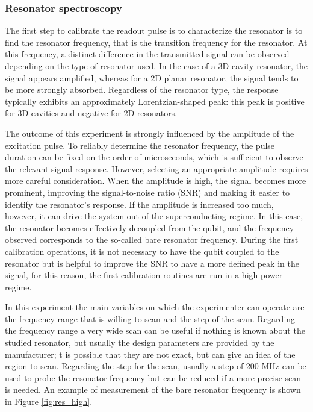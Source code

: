 \subsubsection{Resonator spectroscopy}
The first step to calibrate the readout pulse is to characterize the resonator is to find the resonator frequency, that is the transition frequency for the resonator. 
At this frequency, a distinct difference in the transmitted signal can be observed depending on the type of resonator used. 
In the case of a 3D cavity resonator, the signal appears amplified, whereas for a 2D planar resonator, the signal tends to be more strongly absorbed. 
Regardless of the resonator type, the response typically exhibits an approximately Lorentzian-shaped peak: this peak is positive for 3D cavities and negative for 2D resonators.

The outcome of this experiment is strongly influenced by the amplitude of the excitation pulse. 
To reliably determine the resonator frequency, the pulse duration can be fixed on the order of microseconds, which is sufficient to observe the relevant signal response.
However, selecting an appropriate amplitude requires more careful consideration. When the amplitude is high, the signal becomes more prominent, improving the signal-to-noise ratio (SNR) and making it easier to identify the resonator's response.
If the amplitude is increased too much, however, it can drive the system out of the superconducting regime.  
In this case, the resonator becomes effectively decoupled from the qubit, and the frequency observed corresponds to the so-called bare resonator frequency.
During the first calibration operations, it is not necessary to have the qubit coupled to the resonator but is helpful to improve the SNR to have a more defined peak in the signal, for this reason, the first calibration routines are run in a high-power regime.

In this experiment the main variables on which the experimenter can operate are the frequency range that is willing to scan and the step of the scan. 
Regarding the frequency range a very wide scan can be useful if nothing is known about the studied resonator, but usually the design parameters are provided by the manufacturer; t is possible that they are not exact, but can give an idea of the region to scan.
Regarding the step for the scan, usually a step of 200 MHz can be used to probe the resonator frequency but can be reduced if a more precise scan is needed. 
An example of measurement of the bare resonator frequency is shown in Figure \ref{fig:res_high}.
 
